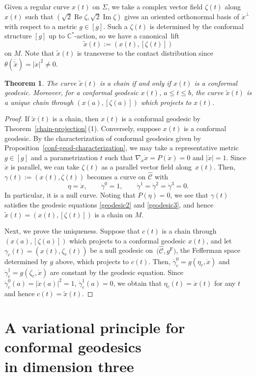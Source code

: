 \documentclass[11pt]{article}
\numberwithin{equation}{section}
\renewcommand\th{\theta}
\newcommand{\wh}{\widehat}
\numberwithin{equation}{section}
\newtheorem{Theorem}{Theorem}[section]
\begin{document}
Given a regular curve $x(t)$ on $\Sigma$, we take a complex vector field $\zeta(t)$ along $x(t)$ such that $(\sqrt{2}\operatorname{Re}\zeta, \sqrt{2}\operatorname{Im}\zeta)$ gives an oriented orthonormal basis of $\dot x^\perp$ with respect to a metric ${g\in[g]}$. Such a $\zeta(t)$ is determined by the conformal structure $[g]$ up to $\mathbb{C}^*$-action, so we have a canonical~lift
\[
\tilde x(t):=(x(t), [\zeta(t)])
\]
on $M$. Note that $\tilde x(t)$ is transverse to the contact distribution since
$\th(\dot{\tilde x})=|\dot x|^2\neq 0$.
\begin{Theorem} \label{canonical-lift}
The curve $\tilde x(t)$ is a chain if and only if $x(t)$ is a conformal geodesic. Moreover, for a conformal geodesic $x(t)$, $a\le t\le b$, the curve $\tilde x(t)$ is a unique chain through $(x(a), [\zeta(a)])$ which projects to $x(t)$.
\end{Theorem}
\begin{proof}
If $\tilde x(t)$ is a chain, then $x(t)$ is a conformal geodesic by Theorem~\ref{chain-projection}\,(1). Conversely, suppose $x(t)$ is a conformal geodesic. By the characterization of conformal geodesics given by Proposition~\ref{conf-geod-characterization}, we may take a representative metric $g\in[g]$ and a parametrization $t$ such that $\nabla_{\dot x}\dot x=P(\dot x)=0$ and $|\dot x|=1$. Since $\dot x$ is parallel, we can take
$\zeta(t)$ as a parallel vector field along~$x(t)$.
Then, $\gamma(t):=(x(t), \zeta(t))$ becomes a curve on $\wh{\mathcal{C}}$ with
\[
\eta=\dot x, \qquad \dot\gamma^0=1, \qquad \dot\gamma^1=\dot\gamma^2=\dot\gamma^3=0.
\]
In particular, it is a null curve. Noting that $P(\eta)=0$, we see that $\gamma(t)$ satisfies the geodesic equations \eqref{geodesic2} and \eqref{geodesic3}, and hence $\tilde x(t)=(x(t), [\zeta(t)])$ is a chain on $M$.

Next, we prove the uniqueness. Suppose that $c (t)$ is a chain through $(x(a), [\zeta(a)])$ which projects to a conformal geodesic $x(t)$, and let $\gamma_c(t)=(x(t), \zeta_c(t))$ be a null geodesic on~${\bigl(\wh{\mathcal{C}}, g^{\mathrm{F}}\bigr)}$, the Fefferman space determined by $g$ above, which projects to $c(t)$. Then, $\dot\gamma_c^0=g(\eta_c, \dot x)$ and $\dot\gamma_c^1=g(\zeta_c, \dot x)$ are constant by the geodesic equation. Since $\dot\gamma_c^0(a)=|\dot x(a)|^2=1$, $\dot\gamma_c^1(a)=0$, we obtain that $\eta_c(t)=\dot x(t)$ for any $t$ and hence $c(t)=\tilde x(t)$.
\end{proof}

\section[A variational principle for conformal geodesics in dimension three]{A variational principle for conformal geodesics\\ in dimension three}\label{variational-principle}
\end{document}
